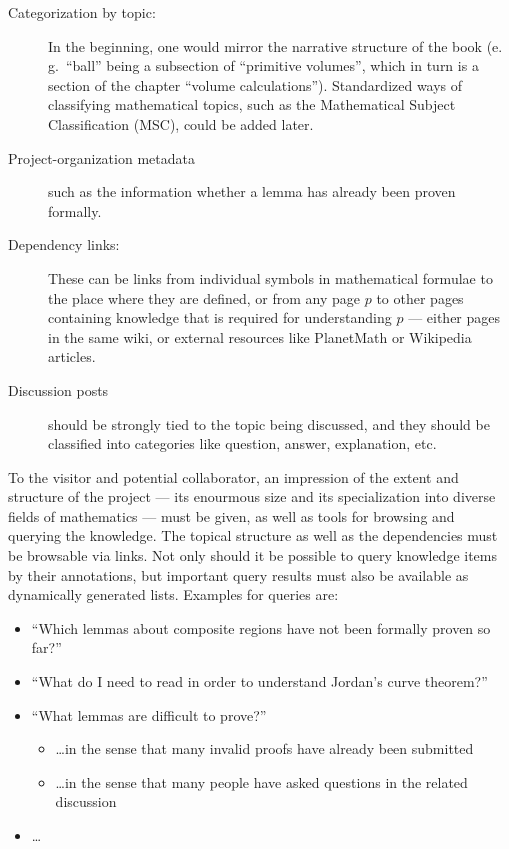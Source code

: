 \documentclass{llncs}
\begin{document}
\begin{description}
\item[Categorization by topic:] In the beginning, one would mirror the narrative structure
  of the book (e.\,g.\ ``ball'' being a subsection of ``primitive volumes'', which in turn
  is a section of the chapter ``volume calculations'').  Standardized ways of classifying
  mathematical topics, such as the Mathematical Subject Classification
  (MSC), could be added later.
\item[Project-organization metadata] such as the information whether a lemma has already
  been proven formally.
\item[Dependency links:] These can be links from individual symbols in mathematical
  formulae to the place where they are defined, or from any page $p$ to other pages
  containing knowledge that is required for understanding $p$ --- either pages in the same
  wiki, or external resources like PlanetMath or Wikipedia articles.
\item[Discussion posts] should be strongly tied to the topic being discussed, and they
  should be classified into categories like question, answer, explanation,
  etc.
\end{description}

To the visitor and potential collaborator, an impression of the extent and structure of
the project --- its enourmous size and its specialization into diverse fields of
mathematics --- must be given, as well as tools for browsing and querying the knowledge.
The topical structure as well as the dependencies must be browsable via links.  Not only
should it be possible to query knowledge items by their annotations, but important query
results must also be available as dynamically generated lists.  Examples for queries are:

\begin{itemize}
\item ``Which lemmas about composite regions have not been formally proven so far?''
\item ``What do I need to read in order to understand Jordan's curve
  theorem?''
\item ``What lemmas are difficult to prove?''
  \begin{itemize}
  \item \ldots in the sense that many invalid proofs have already been submitted
  \item \ldots in the sense that many people have asked questions in the related discussion
  \end{itemize}
\item \ldots{}
\end{itemize}
\end{document}
